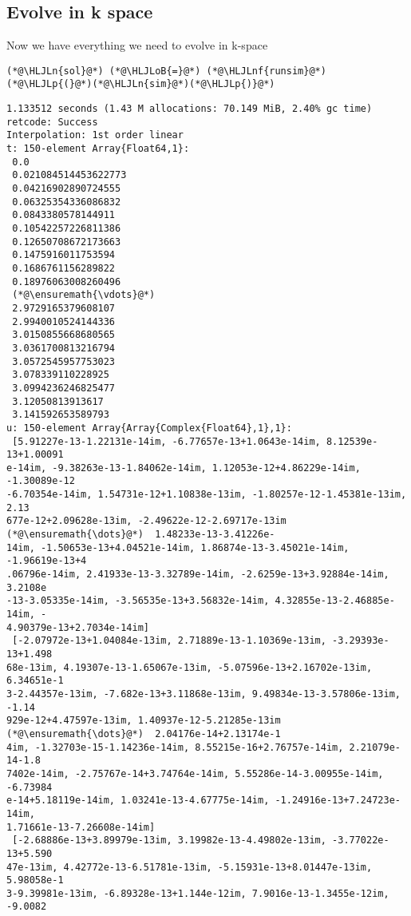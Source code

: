 \documentclass[12pt,a4paper]{article}
\newcommand{\HLJLn}[1]{#1}
\newcommand{\HLJLnf}[1]{\textcolor[RGB]{66,102,213}{#1}}
\newcommand{\HLJLoB}[1]{\textcolor[RGB]{102,102,102}{\textbf{#1}}}
\newcommand{\HLJLp}[1]{#1}
\begin{document}
\subsection{Evolve in k space}
Now we have everything we need to evolve in k-space


\begin{lstlisting}
(*@\HLJLn{sol}@*) (*@\HLJLoB{=}@*) (*@\HLJLnf{runsim}@*)(*@\HLJLp{(}@*)(*@\HLJLn{sim}@*)(*@\HLJLp{)}@*)
\end{lstlisting}

\begin{lstlisting}
1.133512 seconds (1.43 M allocations: 70.149 MiB, 2.40% gc time)
retcode: Success
Interpolation: 1st order linear
t: 150-element Array{Float64,1}:
 0.0                 
 0.021084514453622773
 0.04216902890724555 
 0.06325354336086832 
 0.0843380578144911  
 0.10542257226811386 
 0.12650708672173663 
 0.1475916011753594  
 0.1686761156289822  
 0.18976063008260496 
 (*@\ensuremath{\vdots}@*)                   
 2.9729165379608107  
 2.9940010524144336  
 3.0150855668680565  
 3.0361700813216794  
 3.0572545957753023  
 3.078339110228925   
 3.0994236246825477  
 3.12050813913617    
 3.141592653589793   
u: 150-element Array{Array{Complex{Float64},1},1}:
 [5.91227e-13-1.22131e-14im, -6.77657e-13+1.0643e-14im, 8.12539e-13+1.00091
e-14im, -9.38263e-13-1.84062e-14im, 1.12053e-12+4.86229e-14im, -1.30089e-12
-6.70354e-14im, 1.54731e-12+1.10838e-13im, -1.80257e-12-1.45381e-13im, 2.13
677e-12+2.09628e-13im, -2.49622e-12-2.69717e-13im  (*@\ensuremath{\dots}@*)  1.48233e-13-3.41226e-
14im, -1.50653e-13+4.04521e-14im, 1.86874e-13-3.45021e-14im, -1.96619e-13+4
.06796e-14im, 2.41933e-13-3.32789e-14im, -2.6259e-13+3.92884e-14im, 3.2108e
-13-3.05335e-14im, -3.56535e-13+3.56832e-14im, 4.32855e-13-2.46885e-14im, -
4.90379e-13+2.7034e-14im]    
 [-2.07972e-13+1.04084e-13im, 2.71889e-13-1.10369e-13im, -3.29393e-13+1.498
68e-13im, 4.19307e-13-1.65067e-13im, -5.07596e-13+2.16702e-13im, 6.34651e-1
3-2.44357e-13im, -7.682e-13+3.11868e-13im, 9.49834e-13-3.57806e-13im, -1.14
929e-12+4.47597e-13im, 1.40937e-12-5.21285e-13im  (*@\ensuremath{\dots}@*)  2.04176e-14+2.13174e-1
4im, -1.32703e-15-1.14236e-14im, 8.55215e-16+2.76757e-14im, 2.21079e-14-1.8
7402e-14im, -2.75767e-14+3.74764e-14im, 5.55286e-14-3.00955e-14im, -6.73984
e-14+5.18119e-14im, 1.03241e-13-4.67775e-14im, -1.24916e-13+7.24723e-14im, 
1.71661e-13-7.26608e-14im]   
 [-2.68886e-13+3.89979e-13im, 3.19982e-13-4.49802e-13im, -3.77022e-13+5.590
47e-13im, 4.42772e-13-6.51781e-13im, -5.15931e-13+8.01447e-13im, 5.98058e-1
3-9.39981e-13im, -6.89328e-13+1.144e-12im, 7.9016e-13-1.3455e-12im, -9.0082

\end{lstlisting}
\end{document}
